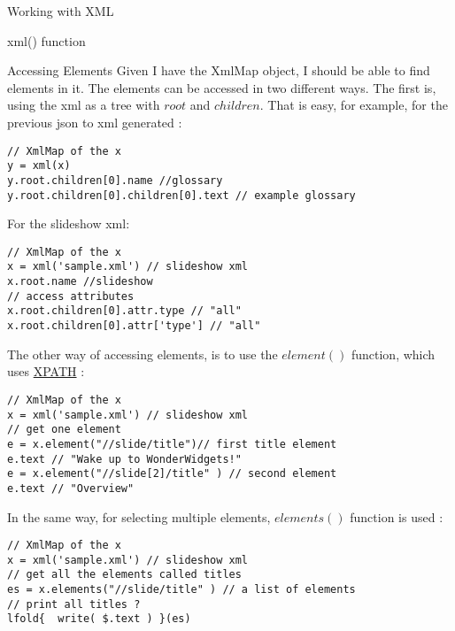 \begin{section}{Working with XML}
\begin{subsection}{xml() function}
\end{subsection}

\begin{subsection}{Accessing Elements}
Given I have the XmlMap object, I should be able to find elements in it.
The elements can be accessed in two different ways.
The first is, using the xml as a tree with $root$ and $children$.
That is easy, for example, for the previous json to xml generated :

\begin{lstlisting}[style=JexlStyle]
// XmlMap of the x 
y = xml(x)
y.root.children[0].name //glossary
y.root.children[0].children[0].text // example glossary 
\end{lstlisting}

For the slideshow xml: 

\begin{center}\begin{minipage}{\linewidth}
\begin{lstlisting}[style=JexlStyle]
// XmlMap of the x 
x = xml('sample.xml') // slideshow xml 
x.root.name //slideshow
// access attributes 
x.root.children[0].attr.type // "all"
x.root.children[0].attr['type'] // "all"
\end{lstlisting}
\end{minipage}\end{center}

The other way of accessing elements, 
is to use the $element()$ function, 
which uses \href{https://en.wikipedia.org/wiki/XPath}{XPATH} :
\begin{lstlisting}[style=JexlStyle]
// XmlMap of the x 
x = xml('sample.xml') // slideshow xml 
// get one element  
e = x.element("//slide/title")// first title element 
e.text // "Wake up to WonderWidgets!"
e = x.element("//slide[2]/title" ) // second element 
e.text // "Overview"
\end{lstlisting}

In the same way, for selecting multiple elements, $elements()$
function is used : 

\begin{lstlisting}[style=JexlStyle]
// XmlMap of the x 
x = xml('sample.xml') // slideshow xml 
// get all the elements called titles  
es = x.elements("//slide/title" ) // a list of elements 
// print all titles ?
lfold{  write( $.text ) }(es)
\end{lstlisting}

\end{subsection}


\end{section}
